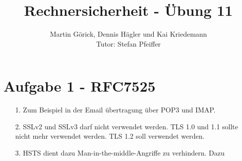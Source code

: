 \documentclass{scrartcl}
\title{Rechnersicherheit - Übung 11}
\author{Martin Görick, Dennis Hägler und Kai Kriedemann \\ Tutor: Stefan Pfeiffer}
\begin{document}
\maketitle


\section*{Aufgabe 1 - RFC7525}
\begin{itemize}
  \item[1.] Zum Beispiel in der Email übertragung über POP3 und IMAP.
  \item[2.] SSLv2 und SSLv3 darf nicht verwendet werden. TLS 1.0 und 1.1 sollte nicht mehr verwendet werden. TLS 1.2 soll verwendet werden.
  \item[3.] HSTS dient dazu Man-in-the-middle-Angriffe zu verhindern. Dazu
\end{itemize}
\end{document}
